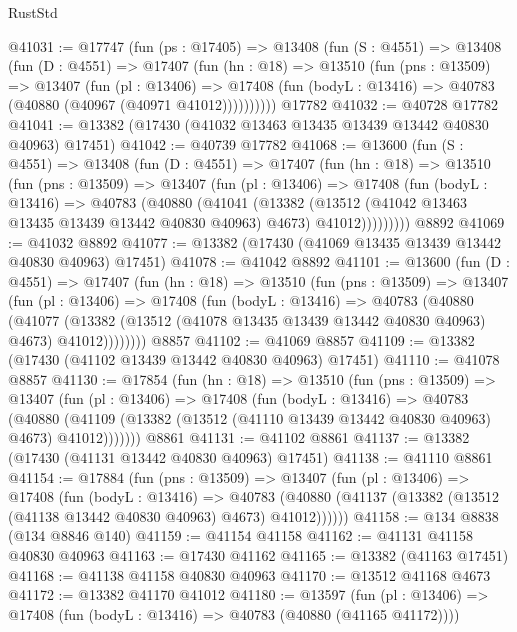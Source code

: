\begin{lexlean}{RustStd}
\begin{coremodule}
@41031 := @17747
    (fun (ps : @17405) =>
    @13408
      (fun (S : @4551) =>
      @13408
        (fun (D : @4551) =>
        @17407
          (fun (hn : @18) =>
          @13510
            (fun (pns : @13509) =>
            @13407
              (fun (pl : @13406) =>
              @17408 (fun (bodyL : @13416) => @40783 (@40880 (@40967 (@40971 @41012))))))))))
    @17782
@41032 := @40728 @17782
@41041 := @13382 (@17430 (@41032 @13463 @13435 @13439 @13442 @40830 @40963) @17451)
@41042 := @40739 @17782
@41068 := @13600
    (fun (S : @4551) =>
    @13408
      (fun (D : @4551) =>
      @17407
        (fun (hn : @18) =>
        @13510
          (fun (pns : @13509) =>
          @13407
            (fun (pl : @13406) =>
            @17408
              (fun (bodyL : @13416) =>
              @40783
                (@40880
                  (@41041
                    (@13382
                      (@13512 (@41042 @13463 @13435 @13439 @13442 @40830 @40963) @4673)
                      @41012)))))))))
    @8892
@41069 := @41032 @8892
@41077 := @13382 (@17430 (@41069 @13435 @13439 @13442 @40830 @40963) @17451)
@41078 := @41042 @8892
@41101 := @13600
    (fun (D : @4551) =>
    @17407
      (fun (hn : @18) =>
      @13510
        (fun (pns : @13509) =>
        @13407
          (fun (pl : @13406) =>
          @17408
            (fun (bodyL : @13416) =>
            @40783
              (@40880
                (@41077
                  (@13382 (@13512 (@41078 @13435 @13439 @13442 @40830 @40963) @4673) @41012))))))))
    @8857
@41102 := @41069 @8857
@41109 := @13382 (@17430 (@41102 @13439 @13442 @40830 @40963) @17451)
@41110 := @41078 @8857
@41130 := @17854
    (fun (hn : @18) =>
    @13510
      (fun (pns : @13509) =>
      @13407
        (fun (pl : @13406) =>
        @17408
          (fun (bodyL : @13416) =>
          @40783
            (@40880
              (@41109 (@13382 (@13512 (@41110 @13439 @13442 @40830 @40963) @4673) @41012)))))))
    @8861
@41131 := @41102 @8861
@41137 := @13382 (@17430 (@41131 @13442 @40830 @40963) @17451)
@41138 := @41110 @8861
@41154 := @17884
    (fun (pns : @13509) =>
    @13407
      (fun (pl : @13406) =>
      @17408
        (fun (bodyL : @13416) =>
        @40783 (@40880 (@41137 (@13382 (@13512 (@41138 @13442 @40830 @40963) @4673) @41012))))))
@41158 := @134 @8838 (@134 @8846 @140)
@41159 := @41154 @41158
@41162 := @41131 @41158 @40830 @40963
@41163 := @17430 @41162
@41165 := @13382 (@41163 @17451)
@41168 := @41138 @41158 @40830 @40963
@41170 := @13512 @41168 @4673
@41172 := @13382 @41170 @41012
@41180 := @13597
    (fun (pl : @13406) => @17408 (fun (bodyL : @13416) => @40783 (@40880 (@41165 @41172))))

\end{coremodule}
\end{lexlean}
